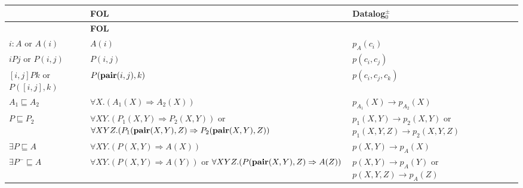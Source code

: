 \small
\begin{longtable}{| p{2cm} | p{8.2cm} | p{5.2cm} |}
	\hline
	\centering \textbf{\dlm} & \centering \textbf{FOL} & \centering \textbf{Datalog$_0^{\pm}$}
	\\
	\endfirsthead
	\hline	
	\centering \textbf{\dlm} & \centering \textbf{FOL} & %
	\\
	\endhead
	
	\hline
		$i:A$ or $A(i)$
		&
		$A(i)$
		&
	$p_A(c_i)$
	\\
		
	\hline
		$i P j$ or $P(i,j)$
		&
		$P(i,j)$
		&
	$p(c_i, c_j)$
	\\
	
	\hline
		$[i,j] P k$ or $P([i,j],k)$
		&
		$P(\pair{i,j},k)$
		&
      $p(c_i, c_j, c_k)$
	\\
	
	\hline
		$A_1 \sqsubseteq A_2$	
		&
		$\forall X.(A_1(X) \Rightarrow A_2(X))$
		&
$p_{A_1}(X) \rightarrow p_{A_2}(X)$
	\\

	\hline
		$P \sqsubseteq P_2$	
		&
		$\forall X Y. (P_1(X,Y) \Rightarrow P_2(X,Y))$ or \newline
		$\forall X Y Z. (P_1(\pair{X,Y},Z) \Rightarrow P_2(\pair{X,Y},Z))$
		&
      $p_1(X,Y) \rightarrow p_2 (X,Y)$   or   $p_1(X,Y,Z) \rightarrow p_2 (X,Y, Z)$
	\\

	\hline
		$\exists P \sqsubseteq A$	
		&
		$\forall X Y. (P(X,Y) \Rightarrow A(X))$
		&
$p(X,Y) \rightarrow p_A (X)$  
	\\

	\hline
		$\exists P^{-} \sqsubseteq A$	
		&
		$\forall X Y. (P(X,Y) \Rightarrow A(Y))$ or \newline
		$\forall X Y Z. (P(\pair{X,Y},Z) \Rightarrow A(Z))$
		&
$p(X,Y) \rightarrow p_A (Y)$   or   $p(X,Y,Z) \rightarrow p_A (Z)$
	\\
	

\end{longtable}
